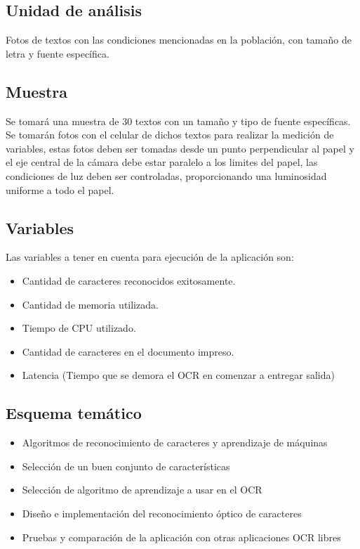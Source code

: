 \documentclass[a4paper, 11pt, oneside]{article}
\begin{document}
	\subsection{Unidad de análisis}
	Fotos de textos con las condiciones mencionadas en la población, con tamaño de letra y fuente 
	específica.

	\subsection{Muestra}
	Se tomará una muestra de 30 textos con un tamaño y tipo de fuente específicas. Se tomarán
	fotos con el celular de dichos textos para realizar la medición de variables, estas fotos deben ser
	tomadas desde un punto perpendicular al papel y el eje central de la cámara debe estar paralelo a 
	los limites del papel, las condiciones de luz deben ser controladas, proporcionando una luminosidad
	uniforme a todo el papel.
	
	\subsection{Variables}
	Las variables a tener en cuenta para ejecución de la aplicación son:
	\begin{itemize}
	\item Cantidad de caracteres reconocidos exitosamente.
	\item Cantidad de memoria utilizada.
	\item Tiempo de CPU utilizado.
	\item Cantidad de caracteres en el documento impreso.
	\item Latencia (Tiempo que se demora el OCR en comenzar a entregar salida)
	\end{itemize}
		
	\subsection{Esquema temático}
	\begin{itemize}
		\item Algoritmos de reconocimiento de caracteres y aprendizaje de máquinas
		\item Selección de un buen conjunto de características
		\item Selección de algoritmo de aprendizaje a usar en el OCR
		\item Diseño e implementación del reconocimiento óptico de caracteres
		\item Pruebas y comparación de la aplicación con otras aplicaciones OCR libres
	\end{itemize}
	\clearpage
	
\end{document}
